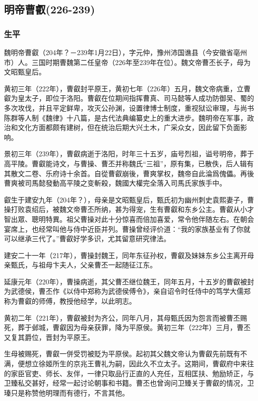 
\subsection{明帝曹叡\tiny(226-239)}

\subsubsection{生平}

魏明帝曹叡（204年？－239年1月22日），字元仲，豫州沛国谯县（今安徽省亳州市）人。三国时期曹魏第二任皇帝（226年至239年在位）。魏文帝曹丕长子，母为文昭甄皇后。

黄初三年（222年），曹叡封平原王，黄初七年（226年）五月，魏文帝病重，立曹叡为皇太子，即位于洛阳。曹叡在位期间指挥曹真、司马懿等人成功防御吴、蜀的多次攻伐，并且平定鲜卑，攻灭公孙渊，设置律博士制度，重视狱讼审理，与尚书陈群等人制《魏律》十八篇，是古代法典编纂史上的重大进步。魏明帝在军事，政治和文化方面都颇有建树，但在统治后期大兴土木，广采众女，因此留下负面影响。

景初三年（239年），曹叡病逝于洛阳，时年三十五岁，庙号烈祖，谥号明帝，葬于高平陵。曹叡能诗文，与曹操、曹丕并称魏氏“三祖”，原有集，已散佚，后人辑有其散文二卷、乐府诗十余首。自從曹叡崩後，曹爽掌权，魏帝自此淪爲傀儡。再後曹爽被司馬懿發動高平陵之变斬殺，魏國大權完全落入司馬氏家族手中。

叡生于建安九年（204年？），母亲是文昭甄皇后，甄氏初为幽州刺史袁熙妻子，曹操打败袁绍后，被魏文帝曹丕所纳，甚为得宠，生有曹叡和东乡公主。曹叡从小才智出眾、聰明特異。祖父曹操对此十分惊喜而倍加喜爱，常令他伴随左右。在朝会宴席上，也经常叫他与侍中近臣并列。曹操曾经评价道：“我的家族基业有了你就可以继承三代了。”曹叡好学多识，尤其留意研究律法。

建安二十一年（217年），曹操封魏王，同年东征孙权，曹叡及妹妹东乡公主离开母亲甄氏，与祖母卞夫人，父亲曹丕一起随征江东。

延康元年（220年），曹操病逝，其父曹丕继位魏王，同年五月，十五岁的曹叡被封为武德侯，曹丕作《以侍中郑称为武德侯傅令》，亲自诏令时任侍中的笃学大儒郑称为曹叡的师傅，教授他经学，以此明志。

黄初二年（221年），曹叡被封为齐公，同年八月，其母甄氏因为怨言而被曹丕赐死，葬于邺城，曹叡因为母亲获罪，降为平原侯。黄初三年（222年）三月，曹丕又复其爵位，晋封为平原王。

生母被赐死，曹叡一併受罚被貶为平原侯。起初其父魏文帝认为曹叡先前既有不满，便想立徐姬所生的京兆王曹礼为嗣，因此久不立太子。这期间，曹叡府中来往的家臣官吏、师长、友伴，一律只取品行正直的人充任，互相匡扶、勉励矫正，与卫臻私交甚好，经常一起讨论朝事和书籍。曹丕也曾询问卫臻关于曹叡的情况，卫瑧只是称赞他明理而有德行，不言其他。

